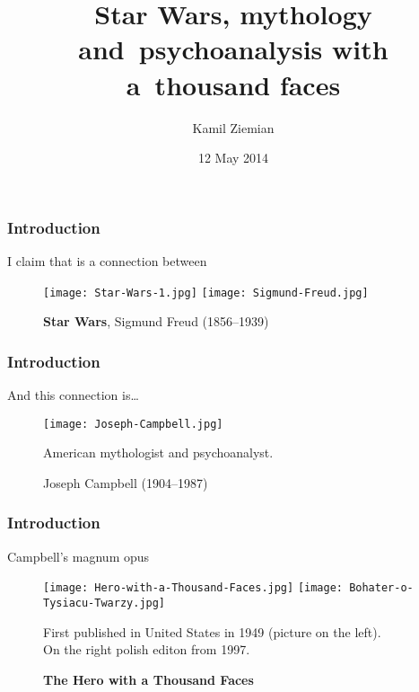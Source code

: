 \documentclass{beamer}  %
\title[]{Star Wars, mythology \\
  and~psychoanalysis with a~thousand faces}
\author{Kamil Ziemian}
\date{12 May 2014}
\begin{document}

\maketitle


\begin{frame}
  \frametitle{Introduction}


  \begin{block}{I claim that is a connection between}
    \begin{figure}
      \centering

      \texttt{[image: Star-Wars-1.jpg]}
      \texttt{[image: Sigmund-Freud.jpg]}
      \caption{\textbf{Star Wars}, Sigmund Freud (1856--1939)}
    \end{figure}
  \end{block}

\end{frame}



\begin{frame}
  \frametitle{Introduction}

  \begin{block}{And this connection is\ldots}
    \begin{figure}
      \centering

      \texttt{[image: Joseph-Campbell.jpg]}
      \caption{Joseph Campbell (1904--1987)}
      American mythologist and psychoanalyst.
    \end{figure}
  \end{block}

\end{frame}



\begin{frame}
  \frametitle{Introduction}

  \begin{block}{Campbell's magnum opus}
    \begin{figure}
      \centering

      \texttt{[image: Hero-with-a-Thousand-Faces.jpg]}
      \texttt{[image: Bohater-o-Tysiacu-Twarzy.jpg]}

      \caption{\textbf{The Hero with a Thousand Faces}}
      First published in United States in 1949 (picture on the
      left). \\
      On the right polish editon from 1997.
    \end{figure}
  \end{block}

\end{frame}
\end{document}
